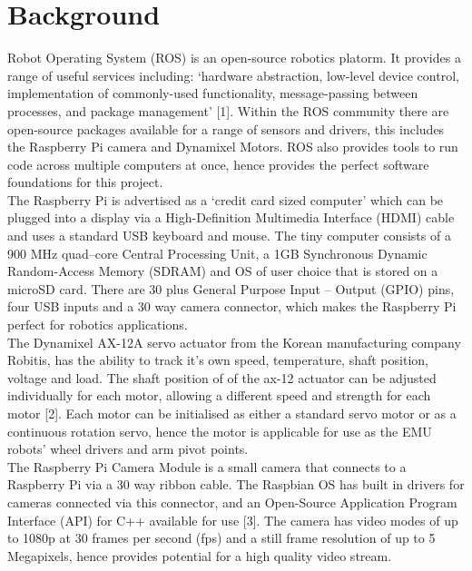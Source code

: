 \documentclass[titlepage,12pt,a4paper]{article}
\begin{document}
\section{Background}
Robot Operating System (ROS) is an open-source robotics platorm. It provides a range of useful services including: ‘hardware abstraction, low-level device control, implementation of commonly-used functionality, message-passing between processes, and package management’ [1]. Within the ROS community there are open-source packages available for a range of sensors and drivers, this includes the Raspberry Pi camera and Dynamixel Motors. ROS also provides tools to run code across multiple computers at once, hence provides the perfect software foundations for this project.\\

\noindent The Raspberry Pi is advertised as a ‘credit card sized computer’ which can be plugged into a display via a High-Definition Multimedia Interface (HDMI) cable and uses a standard USB keyboard and mouse. The tiny computer consists of a 900 MHz quad–core Central Processing Unit, a 1GB Synchronous Dynamic Random-Access Memory (SDRAM) and OS of user choice that is stored on a microSD card. There are 30 plus General Purpose Input – Output (GPIO) pins, four USB inputs and a 30 way camera connector, which makes the Raspberry Pi perfect for robotics applications.\\

\noindent The Dynamixel AX-12A servo actuator from the Korean manufacturing company Robitis, has the ability to track it's own speed, temperature, shaft position, voltage and load. The shaft position of of the ax-12 actuator can be adjusted individually for each motor, allowing a different speed and strength for each motor [2]. Each motor can be initialised as either a standard servo motor or as a continuous rotation servo, hence the motor is applicable for use as the EMU robots’ wheel drivers and arm pivot points.\\

\noindent The Raspberry Pi Camera Module is a small camera that connects to a Raspberry Pi via a 30 way ribbon cable. The Raspbian OS has built in drivers for cameras connected via this connector, and an Open-Source Application Program Interface (API) for C++ available for use [3].  The camera has video modes of up to 1080p at 30 frames per second (fps) and a still frame resolution of up to 5 Megapixels, hence provides potential for a high quality video stream.\\
\end{document}
